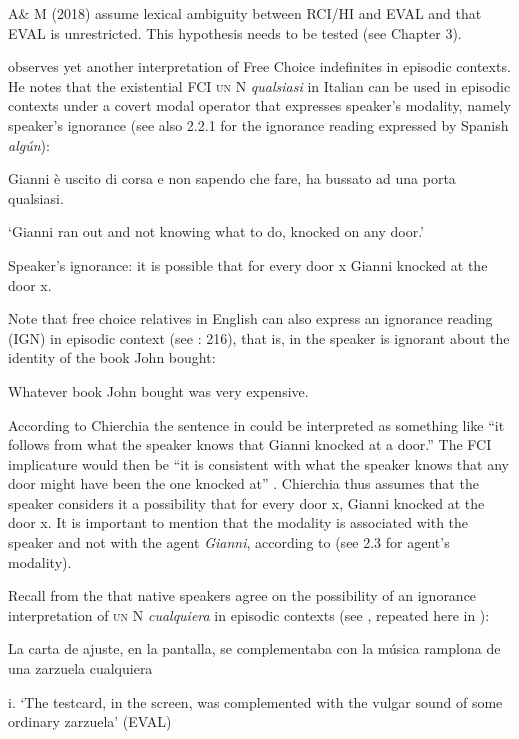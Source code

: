   A\& M (2018) assume lexical ambiguity between RCI/HI and EVAL and that EVAL is unrestricted. This hypothesis needs to be tested (see Chapter 3).

  \citet[574]{Chierchia2006} observes yet another interpretation of Free Choice indefinites in episodic contexts. He notes that the existential FCI \textsc{un} N \textit{qualsiasi} in Italian can be used in episodic contexts under a covert modal operator that expresses speaker’s modality, namely speaker’s ignorance (see also 2.2.1 for the ignorance reading expressed by Spanish \textit{algún}):

\label{bkm:Ref533762757}  Gianni è uscito di corsa e non sapendo che fare, ha bussato ad una porta qualsiasi.

  ‘Gianni ran out and not knowing what to do, knocked on any door.’

Speaker’s ignorance: it is possible that for every door x Gianni knocked at the door x.

  \citep[574]{Chierchia2006}

Note that free choice relatives in English can also express an ignorance reading (IGN) in episodic context (see \citealt{Condoravdi2015}: 216), that is, in  the speaker is ignorant about the identity of the book John bought:

  Whatever book John bought was very expensive.

According to Chierchia the sentence in  could be interpreted as something like “it follows from what the speaker knows that Gianni knocked at a door.” The FCI implicature would then be “it is consistent with what the speaker knows that any door might have been the one knocked at” \citep[574]{Chierchia2006}. Chierchia thus assumes that the speaker considers it a possibility that for every door x, Gianni knocked at the door x. It is important to mention that the modality is associated with the speaker and not with the agent \textit{Gianni}, according to \citet{Chierchia2006} (see 2.3 for agent’s modality). 

  Recall from the  that native speakers agree on the possibility of an ignorance interpretation of \textsc{un} N \textit{cualquiera} in episodic contexts (see , repeated here in ):

\label{bkm:Ref72400981}  La carta de ajuste, en la pantalla, se complementaba con la música ramplona de una zarzuela cualquiera 

  i.   ‘The testcard, in the screen, was complemented with the vulgar sound of some ordinary zarzuela’   (EVAL)

